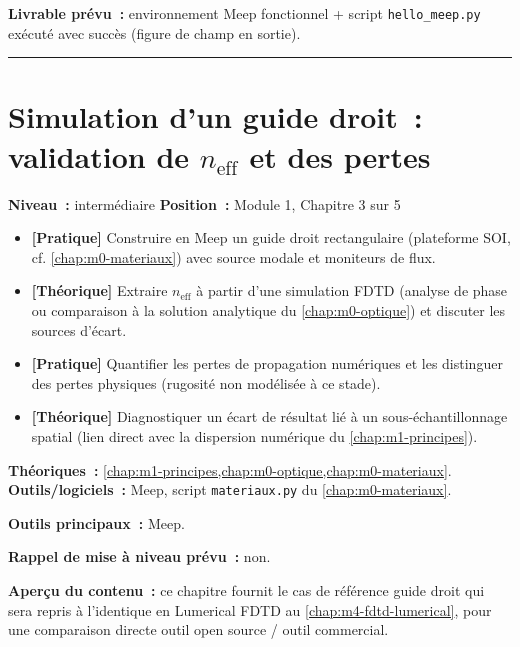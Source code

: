 \noindent\textbf{Livrable prévu~:} environnement Meep fonctionnel + script \texttt{hello\_meep.py} exécuté avec succès (figure de champ en sortie).

\bigskip\hrule\bigskip

\chapter{Simulation d'un guide droit~: validation de $n_{\text{eff}}$ et des pertes}
\label{chap:m1-guide}

\noindent\textbf{Niveau~:} intermédiaire \hfill \textbf{Position~:} Module 1, Chapitre 3 sur 5

\begin{objectifs}
\begin{itemize}[leftmargin=1.4em]
  \item \textbf{[Pratique]} Construire en Meep un guide droit rectangulaire (plateforme SOI, cf. \cref{chap:m0-materiaux}) avec source modale et moniteurs de flux.
  \item \textbf{[Théorique]} Extraire $n_{\text{eff}}$ à partir d'une simulation FDTD (analyse de phase ou comparaison à la solution analytique du \cref{chap:m0-optique}) et discuter les sources d'écart.
  \item \textbf{[Pratique]} Quantifier les pertes de propagation numériques et les distinguer des pertes physiques (rugosité non modélisée à ce stade).
  \item \textbf{[Théorique]} Diagnostiquer un écart de résultat lié à un sous-échantillonnage spatial (lien direct avec la dispersion numérique du \cref{chap:m1-principes}).
\end{itemize}
\end{objectifs}

\begin{prerequis}
\textbf{Théoriques~:} \cref{chap:m1-principes,chap:m0-optique,chap:m0-materiaux}.\\
\textbf{Outils/logiciels~:} Meep, script \texttt{materiaux.py} du \cref{chap:m0-materiaux}.
\end{prerequis}

\noindent\textbf{Outils principaux~:} Meep.

\noindent\textbf{Rappel de mise à niveau prévu~:} non.

\noindent\textbf{Aperçu du contenu~:} ce chapitre fournit le cas de référence \og guide droit\fg{} qui sera repris à l'identique en Lumerical FDTD au \cref{chap:m4-fdtd-lumerical}, pour une comparaison directe outil open source / outil commercial.

